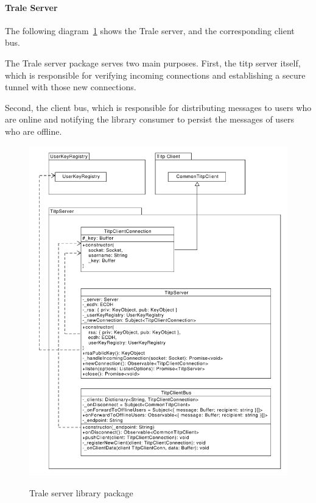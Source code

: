 \paragraph{Trale Server}
The following diagram~\ref{fig:figure36} shows the Trale server, and the corresponding client bus.

The Trale server package serves two main purposes.
First, the \ac{titp} server itself, which is responsible for verifying incoming connections and establishing a secure
tunnel with those new connections.

Second, the client bus, which is responsible for distributing messages to users who are online and notifying the library
consumer to persist the messages of users who are offline.

\begin{figure}[H]
    \centering
    \caption{Trale server library package}
    \includegraphics[width=1.0\textwidth]{./graphics/classDiagramTransportLibrary-Server}
    \label{fig:figure36}
\end{figure}

